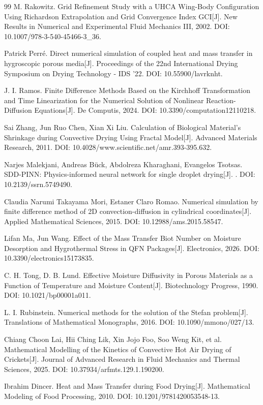 \documentclass[withoutpreface,bwprint]{cumcmthesis}
\begin{document}
\begin{thebibliography}{99}
 M. Rakowitz. Grid Refinement Study with a UHCA Wing-Body Configuration Using Richardson Extrapolation and Grid Convergence Index GCI[J]. New Results in Numerical and Experimental Fluid Mechanics III, 2002. DOI: 10.1007/978-3-540-45466-3\_36.

 Patrick Perré. Direct numerical simulation of coupled heat and mass transfer in hygroscopic porous media[J]. Proceedings of the 22nd International Drying Symposium on Drying Technology - IDS '22. DOI: 10.55900/lavrknht.

 J. I. Ramos. Finite Difference Methods Based on the Kirchhoff Transformation and Time Linearization for the Numerical Solution of Nonlinear Reaction-Diffusion Equations[J]. De Computis, 2024. DOI: 10.3390/computation12110218.

 Sai Zhang, Jun Ruo Chen, Xian Xi Liu. Calculation of Biological Material's Shrinkage during Convective Drying Using Fractal Model[J]. Advanced Materials Research, 2011. DOI: 10.4028/www.scientific.net/amr.393-395.632.

 Narjes Malekjani, Andreas Bück, Abdolreza Kharaghani, Evangelos Tsotsas. SDD-PINN: Physics-informed neural network for single droplet drying[J]. . DOI: 10.2139/ssrn.5749490.

 Claudia Narumi Takayama Mori, Estaner Claro Romao. Numerical simulation by finite difference method of 2D convection-diffusion in cylindrical coordinates[J]. Applied Mathematical Sciences, 2015. DOI: 10.12988/ams.2015.58547.

 Lifan Ma, Jun Wang. Effect of the Mass Transfer Biot Number on Moisture Desorption and Hygrothermal Stress in QFN Packages[J]. Electronics, 2026. DOI: 10.3390/electronics15173835.

 C. H. Tong, D. B. Lund. Effective Moisture Diffusivity in Porous Materials as a Function of Temperature and Moisture Content[J]. Biotechnology Progress, 1990. DOI: 10.1021/bp00001a011.

 L. I. Rubinstein. Numerical methods for the solution of the Stefan problem[J]. Translations of Mathematical Monographs, 2016. DOI: 10.1090/mmono/027/13.

 Chiang Choon Lai, Hii Ching Lik, Xin Jojo Foo, Soo Weng Kit, et al. Mathematical Modelling of the Kinetics of Convective Hot Air Drying of Crickets[J]. Journal of Advanced Research in Fluid Mechanics and Thermal Sciences, 2025. DOI: 10.37934/arfmts.129.1.190200.

 Ibrahim Dincer. Heat and Mass Transfer during Food Drying[J]. Mathematical Modeling of Food Processing, 2010. DOI: 10.1201/9781420053548-13.

\end{thebibliography}

\label{mh:body-end}




\begin{appendices}



\end{appendices}
\end{document}
